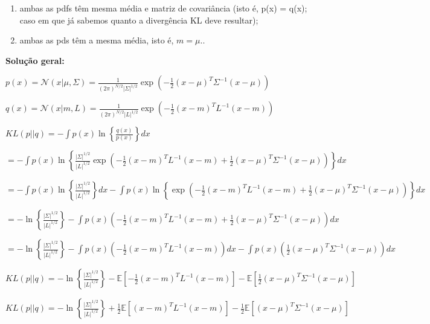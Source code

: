 \begin{enumerate}
 \begin{enumerate}
    \item ambas as pdfs têm mesma média e matriz de covariância (isto é, p(x) = q(x); caso em que já sabemos quanto a divergência KL deve resultar);
    
    \item ambas as pds têm a mesma média, isto é, $m = \mu.$.

 \end{enumerate}
 \par
    \textbf{Solução geral:}

    $\displaystyle p(x) = \mathcal{N}(x|\mu, \Sigma) = \frac{1}{(2\pi)^{N/2} |\Sigma|^{1/2}} \exp \left( -\frac{1}{2} (x - \mu)^T \Sigma^{-1} (x - \mu) \right)$ 

    $\displaystyle q(x) = \mathcal{N}(x|m, L) = \frac{1}{(2\pi)^{N/2} |L|^{1/2}} \exp \left( -\frac{1}{2} (x - m)^T L^{-1} (x - m) \right)$ 

    $KL(p || q) = - \int p(x) \ln \left\{ \frac{q(x)}{p(x)} \right\} dx $
    
    $= - \int p(x) \ln \left\{\frac{|\Sigma|^{1/2}}{|L|^{1/2}}\exp\left( -\frac{1}{2} (x - m)^T L^{-1} (x - m) +  \frac{1}{2} (x - \mu)^T \Sigma^{-1} (x - \mu)      \right)  \right\} dx $


    $= - \int p(x) \ln \left\{\frac{|\Sigma|^{1/2}}{|L|^{1/2}} \right\} dx - \int p(x) \ln \left\{ \exp \left( -\frac{1}{2} (x - m)^T L^{-1} (x - m) +  \frac{1}{2} (x - \mu)^T \Sigma^{-1} (x - \mu)      \right)  \right\} dx $


    $= - \ln \left\{\frac{|\Sigma|^{1/2}}{|L|^{1/2}} \right\} - \int p(x)\left( -\frac{1}{2} (x - m)^T L^{-1} (x - m) +  \frac{1}{2} (x - \mu)^T \Sigma^{-1} (x - \mu) \right) dx $

    $= - \ln \left\{\frac{|\Sigma|^{1/2}}{|L|^{1/2}} \right\} - \int p(x)\left( -\frac{1}{2} (x - m)^T L^{-1} (x - m)\right) dx - \int p(x)\left( \frac{1}{2} (x - \mu)^T \Sigma^{-1} (x - \mu) \right) dx $  



    $ KL(p || q) = - \ln \left\{\frac{|\Sigma|^{1/2}}{|L|^{1/2}} \right\} - \mathbb{E}\left[ -\frac{1}{2} (x - m)^T L^{-1} (x - m) \right] -  \mathbb{E} \left[\frac{1}{2} (x - \mu)^T \Sigma^{-1} (x - \mu) \right]  $

    $ KL(p || q) = - \ln \left\{\frac{|\Sigma|^{1/2}}{|L|^{1/2}} \right\} + \frac{1}{2} \mathbb{E}\left[  (x - m)^T L^{-1} (x - m) \right] -   \frac{1}{2}\mathbb{E} \left[(x - \mu)^T \Sigma^{-1} (x - \mu) \right]  $


\end{enumerate}
